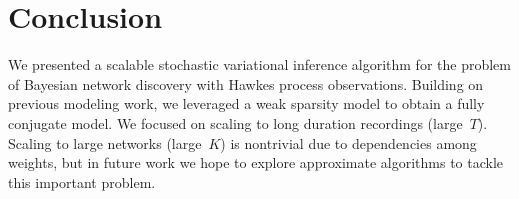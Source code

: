 \section{Conclusion}
We presented a scalable stochastic variational inference algorithm for the problem of Bayesian network discovery with Hawkes process observations. Building on previous modeling work, we leveraged a weak sparsity model to obtain a fully conjugate model. We focused on scaling to long duration recordings (large~$T$). Scaling to large networks (large~$K$) is nontrivial due to dependencies among weights, but in future work we hope to explore approximate algorithms to tackle this important problem.
